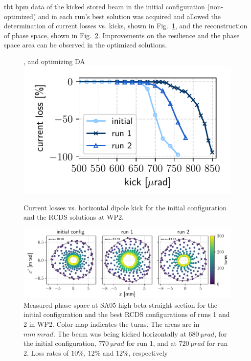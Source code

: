 \gls*{tbt} \gls*{bpm} data of the kicked stored beam  in the initial configuration (non-optimized) and in each run's best solution was acquired and allowed the determination of current losses vs. kicks, shown in Fig.~\ref{fig:loss_kicks_newtunes}, and the reconstruction of phase space, shown in Fig.~\ref{fig:newtunes_phase}. Improvements on the resilience and the phase space area can be observed in the optimized solutions.
\begin{figure}[tb]
    \centering , and optimizing DA
    \includegraphics[width=0.6\columnwidth]{Images/WEPL087_f3.pdf}
    \caption[Current losses vs. horizontal dipole kick for the initial configuration and the RCDS solutions at WP 2.]{Current losses vs. horizontal dipole kick for the initial configuration and the \gls*{RCDS} solutions at \gls*{WP2}.}
    \label{fig:loss_kicks_newtunes}
\end{figure}
\begin{figure}[htb]
    \includegraphics[width=\textwidth]{Images/WEPL087_f4.pdf}
    \caption[Measured phase space at SA05 high-beta straight section for the initial configuration and the best RCDS configurations of runs 1 and 2 in WP2.]{Measured phase space at SA05 high-beta straight section for the initial configuration and the best \gls*{RCDS} configurations of runs 1 and 2 in \gls*{WP2}. Color-map indicates the turns. The areas are in $\unit{mm}~\unit{mrad}$. The beam was being kicked horizontally at $680~\unit{\micro rad}$, for the initial configuration, $770~\unit{\micro rad}$ for run 1, and at $720~\unit{\micro rad}$ for run 2. Loss rates of $10\%$, $12\%$ and $12\%$, respectively}
    \label{fig:newtunes_phase}
\end{figure}

